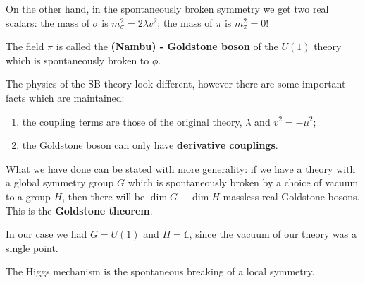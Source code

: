 \documentclass[main.tex]{subfiles}
\begin{document}
On the other hand, in the spontaneously broken symmetry we get two real scalars: the mass of \(\sigma \) is \(m_\sigma^2 =  2 \lambda v^2\); the mass of \(\pi \) is \(m_\pi^2 = 0\)!

The field \(\pi \) is called the \textbf{(Nambu) - Goldstone boson} of the \(U(1)\) theory which is spontaneously broken to \(\phi \). 


The physics of the SB theory look different, however there are some important facts which are maintained: 
\begin{enumerate}
    \item the coupling terms are those of the original theory, \(\lambda \) and \(v^2 = - \mu^2\);
    \item the Goldstone boson can only have \textbf{derivative couplings}.
\end{enumerate}

What we have done can be stated with more generality: if we have a theory with a global symmetry group \(G\) which is spontaneously broken by a choice of vacuum to a group \(H\), then there will be \(\dim G - \dim H\) massless real Goldstone bosons. 
This is the \textbf{Goldstone theorem}.

In our case we had \(G = U(1)\) and \(H = \mathbb{1}\), since the vacuum of our theory was a single point. 

The Higgs mechanism is the spontaneous breaking of a local symmetry. 
\end{document}
